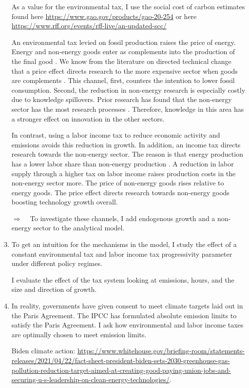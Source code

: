 \documentclass[12pt]{article}
\newcommand{\ar}{$\Rightarrow$ \ }
\begin{document}
\begin{enumerate}
As a value for the environmental tax, I use the social cost of carbon estimates found here
\url{https://www.gao.gov/products/gao-20-254} or here \url{https://www.rff.org/events/rff-live/an-updated-scc/}



An environmental tax levied on fossil production raises the price of energy. Energy and non-energy goods enter as complements into the production of the final good \citep{Hassler2016EnvironmentalMacroeconomics, Fried2018ClimateAnalysis}. We know from the literature on directed technical change that a price effect  directs research to the more expensive sector when goods are complements \citep{Acemoglu2002DirectedChange, Hemous2021DirectedEconomics}.
This channel, first, counters the intention to lower fossil consumption. Second, the reduction in non-energy research is especially costly due to knowledge spillovers. Prior research has found that the non-energy sector has the most research processes \citep{Fried2018ClimateAnalysis}. Therefore, knowledge in this area has a stronger effect on innovation in the other sectors.  

In contrast, using a labor income tax to reduce economic activity and emissions avoids this reduction in growth. In addition, an income tax directs research towards the non-energy sector. The reason is that energy production has a lower labor share than non-energy production \citep{Fried2018ClimateAnalysis}. A reduction in labor supply through a higher tax on labor income raises production costs in the non-energy sector more. The price of non-energy goods rises relative to energy goods. The price effect directs research towards non-energy goods boosting technology growth overall. 

\item[\ar] 
 To investigate these channels, I add endogenous growth and a non-energy sector to the analytical model. 
\item To get an intuition for the mechanisms in the model, I study the effect of a constant environmental tax and labor income tax progressivity parameter under different policy regimes. 

I evaluate the effect of the tax system looking at emissions, hours, and the size and direction of growth. 

\item In reality, governments have given consent to meet climate targets laid out in the Paris Agreement. The IPCC has formulated absolute emission limits to satisfy the Paris Agreement. I ask how environmental and labor income taxes are optimally chosen to meet emission limits. 

Biden climate action: 
\url{https://www.whitehouse.gov/briefing-room/statements-releases/2021/04/22/fact-sheet-president-biden-sets-2030-greenhouse-gas-pollution-reduction-target-aimed-at-creating-good-paying-union-jobs-and-securing-u-s-leadership-on-clean-energy-technologies/}. 
\end{enumerate}
\clearpage

	
\end{document}

